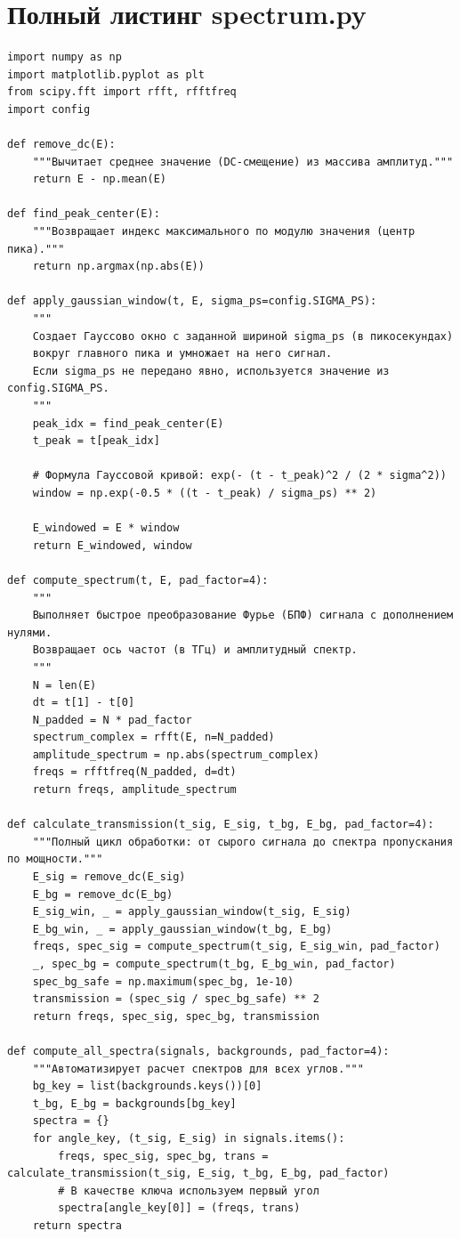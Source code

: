 \section{Полный листинг spectrum.py} \label{app:spectrum}
\begin{verbatim}
import numpy as np
import matplotlib.pyplot as plt
from scipy.fft import rfft, rfftfreq
import config

def remove_dc(E):
    """Вычитает среднее значение (DC-смещение) из массива амплитуд."""
    return E - np.mean(E)

def find_peak_center(E):
    """Возвращает индекс максимального по модулю значения (центр пика)."""
    return np.argmax(np.abs(E))

def apply_gaussian_window(t, E, sigma_ps=config.SIGMA_PS):
    """
    Создает Гауссово окно с заданной шириной sigma_ps (в пикосекундах) 
    вокруг главного пика и умножает на него сигнал.
    Если sigma_ps не передано явно, используется значение из config.SIGMA_PS.
    """
    peak_idx = find_peak_center(E)
    t_peak = t[peak_idx]
    
    # Формула Гауссовой кривой: exp(- (t - t_peak)^2 / (2 * sigma^2))
    window = np.exp(-0.5 * ((t - t_peak) / sigma_ps) ** 2)
    
    E_windowed = E * window
    return E_windowed, window

def compute_spectrum(t, E, pad_factor=4):
    """
    Выполняет быстрое преобразование Фурье (БПФ) сигнала с дополнением нулями. 
    Возвращает ось частот (в ТГц) и амплитудный спектр.
    """
    N = len(E)
    dt = t[1] - t[0] 
    N_padded = N * pad_factor
    spectrum_complex = rfft(E, n=N_padded)
    amplitude_spectrum = np.abs(spectrum_complex)
    freqs = rfftfreq(N_padded, d=dt)
    return freqs, amplitude_spectrum

def calculate_transmission(t_sig, E_sig, t_bg, E_bg, pad_factor=4):
    """Полный цикл обработки: от сырого сигнала до спектра пропускания по мощности."""
    E_sig = remove_dc(E_sig)
    E_bg = remove_dc(E_bg)
    E_sig_win, _ = apply_gaussian_window(t_sig, E_sig)
    E_bg_win, _ = apply_gaussian_window(t_bg, E_bg)
    freqs, spec_sig = compute_spectrum(t_sig, E_sig_win, pad_factor)
    _, spec_bg = compute_spectrum(t_bg, E_bg_win, pad_factor)
    spec_bg_safe = np.maximum(spec_bg, 1e-10)
    transmission = (spec_sig / spec_bg_safe) ** 2
    return freqs, spec_sig, spec_bg, transmission

def compute_all_spectra(signals, backgrounds, pad_factor=4):
    """Автоматизирует расчет спектров для всех углов."""
    bg_key = list(backgrounds.keys())[0]
    t_bg, E_bg = backgrounds[bg_key]
    spectra = {}
    for angle_key, (t_sig, E_sig) in signals.items():
        freqs, spec_sig, spec_bg, trans = calculate_transmission(t_sig, E_sig, t_bg, E_bg, pad_factor)
        # В качестве ключа используем первый угол
        spectra[angle_key[0]] = (freqs, trans)
    return spectra
\end{verbatim}

